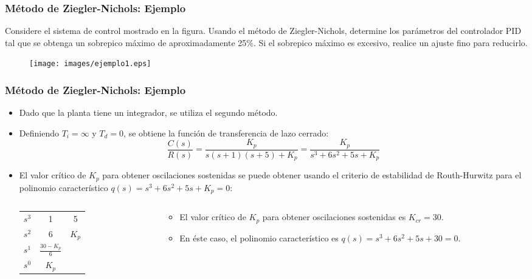 \documentclass[aspectratio=169]{beamer}
\theoremstyle{definition}
\theoremstyle{plain}
\theoremstyle{remark}
\begin{document}
\begin{frame}[<+->]\frametitle{Método de Ziegler-Nichols: Ejemplo}
Considere el sistema de control mostrado en la figura. Usando el método de Ziegler-Nichols, determine los parámetros del controlador PID tal que se obtenga un sobrepico máximo de aproximadamente 25\%. Si el sobrepico máximo es excesivo, realice un ajuste fino para reducirlo.
\begin{figure}
\texttt{[image: images/ejemplo1.eps]}
\end{figure}
\end{frame}

\begin{frame}[<+->]\frametitle{Método de Ziegler-Nichols: Ejemplo}
\begin{itemize}
	\item Dado que la planta tiene un integrador, se utiliza el segundo método.
	\item Definiendo $T_i = \infty$ y $T_d = 0$, se obtiene la función de transferencia de lazo cerrado:
	\begin{equation*}
		\frac{C(s)}{R(s)} = \frac{K_p}{s(s+1)(s+5) + K_p} = \frac{K_p}{s^3 + 6s^2 + 5s + K_p}
	\end{equation*}
	\item El valor crítico de $K_p$ para obtener oscilaciones sostenidas se puede obtener usando el criterio de estabilidad de Routh-Hurwitz para el polinomio característico $q(s) = s^3 + 6s^2 + 5s + K_p = 0$:
	\begin{columns}
	\begin{column}{0.4\textwidth}
		\begin{table}
		\begin{tabular}{c|cc}
			$s^3$ & 1 & 5\\
			$s^2$ & 6 & $K_p$\\
			$s^1$ & $\frac{30-K_p}{6}$ & \\
			$s^0$ & $K_p$ & 
		\end{tabular}
		\end{table}
	\end{column}	
	\begin{column}{0.6\textwidth}
		\begin{itemize}
			\item El valor crítico de $K_p$ para obtener oscilaciones sostenidas es $K_{cr} = 30$.
			\item En éste caso, el polinomio característico es $q(s) = s^3 + 6s^2 + 5s + 30 = 0$.
		\end{itemize}
	\end{column}	
	\end{columns}
\end{itemize}
\end{frame}
\end{document}
